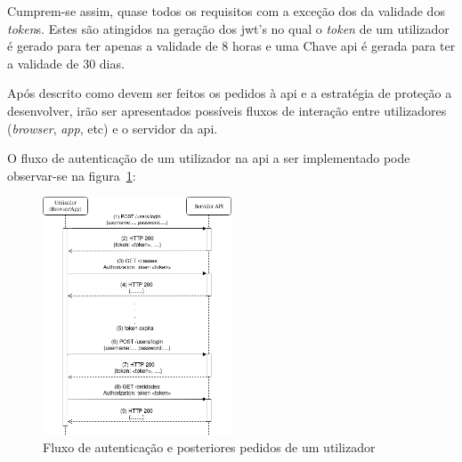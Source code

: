 Cumprem-se assim, quase todos os requisitos com a exceção dos da validade dos \textit{token}s. 
Estes são atingidos na geração dos \acrshort{jwt}'s no qual o \textit{token} de um utilizador é gerado para 
ter apenas a validade de 8 horas e uma Chave \acrshort{api} é gerada para ter a validade de 30 dias.

Após descrito como devem ser feitos os pedidos à \acrshort{api} e a estratégia de proteção a desenvolver, irão ser 
apresentados possíveis fluxos de interação entre utilizadores (\textit{browser}, \textit{app}, etc) e o 
servidor da \acrshort{api}.

O fluxo de autenticação de um utilizador na \acrshort{api} a ser implementado pode observar-se na figura~\ref{fig:userAuth}:
\begin{figure}[H]
    \centering
    \includegraphics[width=0.5\textwidth]{img/userAuth.png}
    \caption{Fluxo de autenticação e posteriores pedidos de um utilizador}\label{fig:userAuth}
\end{figure}

